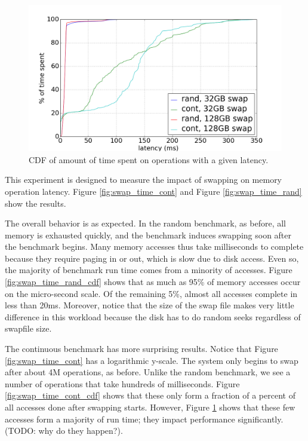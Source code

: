 \documentclass[twocolumn,11pt]{article}
\begin{document}
\begin{figure}[t]
    \includegraphics[width=\columnwidth]{figures/swap_time_cdf}
    \caption{CDF of amount of time spent on operations with a given
    latency.\label{fig:swap_time_cdf}}
\end{figure}

This experiment is designed to measure the impact of swapping on memory
operation latency. Figure \ref{fig:swap_time_cont} and Figure
\ref{fig:swap_time_rand} show the results.

The overall behavior is as expected. In the random benchmark, as before, all
memory is exhausted quickly, and the benchmark induces swapping soon after the
benchmark begins. Many memory accesses thus take milliseconds to complete
because they require paging in or out, which is slow due to disk access.
Even so, the majority of benchmark run time comes from a minority of accesses.
Figure \ref{fig:swap_time_rand_cdf} shows that as much as 95\% of memory
accesses occur on the micro-second scale. Of the remaining 5\%, almost all
accesses complete in less than 20ms. Moreover, notice that the size of the
swap file makes very little difference in this workload because the disk has to
do random seeks regardless of swapfile size.

The continuous benchmark has more surprising results. Notice that Figure
\ref{fig:swap_time_cont} has a logarithmic y-scale. The system only begins to
swap after about 4M operations, as before. Unlike the random benchmark, we see a
number of operations that take hundreds of milliseconds. Figure
\ref{fig:swap_time_cont_cdf} shows that these only form a fraction of a percent
of all accesses done after swapping starts. However, Figure
\ref{fig:swap_time_cdf} shows that these few accesses form a majority of run
time; they impact performance significantly. (TODO: why do they happen?).
\end{document}

